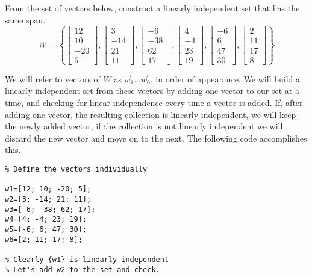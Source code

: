 \documentclass{ximera}
\begin{document}
\begin{example}\label{ex_oct_redundant}
   From the set of vectors below, construct a linearly independent set that has the same span.
    $$W=\left\{\begin{bmatrix}12\\10\\-20\\5\end{bmatrix}, \begin{bmatrix}3\\-14\\21\\11\end{bmatrix},\begin{bmatrix}-6\\-38\\62\\17\end{bmatrix},\begin{bmatrix}4\\-4\\23\\19\end{bmatrix}, \begin{bmatrix}-6\\6\\47\\30\end{bmatrix}, \begin{bmatrix}2\\11\\17\\8\end{bmatrix}\right\}$$
    \begin{explanation}
        We will refer to vectors of $W$ as $\vec{w}_1\dots\vec{w}_6$, in order of appearance.
        We will build a linearly independent set from these vectors by adding one vector to our set at a time, and checking for linear independence every time a vector is added.  If, after adding one vector, the resulting collection is linearly independent, we will keep the newly added vector, if the collection is not linearly independent we will discard the new vector and move on to the next. The following code accomplishes this.

        \begin{verbatim}
% Define the vectors individually

w1=[12; 10; -20; 5];
w2=[3; -14; 21; 11];
w3=[-6; -38; 62; 17];
w4=[4; -4; 23; 19];
w5=[-6; 6; 47; 30];
w6=[2; 11; 17; 8];

% Clearly {w1} is linearly independent
% Let's add w2 to the set and check.


\end{verbatim}
\end{explanation}
\end{example}
\end{document}

